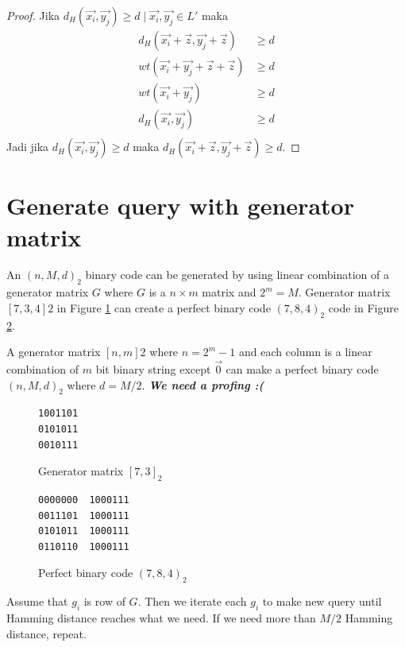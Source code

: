 \documentclass[conference,compsoc]{IEEEtran}
\begin{document}
\begin{proof}
Jika $d_H(\vec{x_i},\vec{y_j}) \ge d \mid \vec{x_i},\vec{y_j} \in L'$ maka
\begin{align*}
d_H(\vec{x_i}+\vec{z},\vec{y_j}+\vec{z}) &\ge d \\
wt(\vec{x_i}+\vec{y_j}+\vec{z}+\vec{z}) &\ge d \\
wt(\vec{x_i}+\vec{y_j}) &\ge d \\
d_H(\vec{x_i},\vec{y_j}) &\ge d \\
\end{align*}
Jadi jika $d_H(\vec{x_i},\vec{y_j}) \ge d$ maka $d_H(\vec{x_i}+\vec{z},\vec{y_j}+\vec{z}) \ge d$.
\end{proof}


\section{Generate query with generator matrix}

An $(n,M,d)_2$ binary code can be generated by using linear combination of a generator matrix $G$ where $G$ is a $n \times m$ matrix and $2^m = M$. Generator matrix $[7,3,4]2$ in Figure \ref{fig:generator734} can create a perfect binary code $(7,8,4)_2$ code in Figure \ref{fig:binarycode784}. 

A generator matrix $[n, m]2$ where $n = 2^m - 1$ and each column is a linear combination of $m$ bit binary string except $\vec{0}$ can make a perfect binary code $(n,M,d)_2$ where $d = M/2$. \textbf{\textit{We need a profing :(}}

\begin{figure}
\centering
\begin{BVerbatim}
1001101
0101011
0010111
\end{BVerbatim}
\caption{Generator matrix $[7,3]_2$}
\label{fig:generator734}
\end{figure}

\begin{figure}
\centering
\begin{BVerbatim}
0000000  1000111
0011101  1000111
0101011  1000111
0110110  1000111
\end{BVerbatim}
\caption{Perfect binary code $(7,8,4)_2$}
\label{fig:binarycode784}
\end{figure}

Assume that $g_i$ is row of $G$. Then we iterate each $g_i$ to make new query until Hamming distance reaches what we need. If we need more than $M/2$ Hamming distance, repeat.




\end{document}
